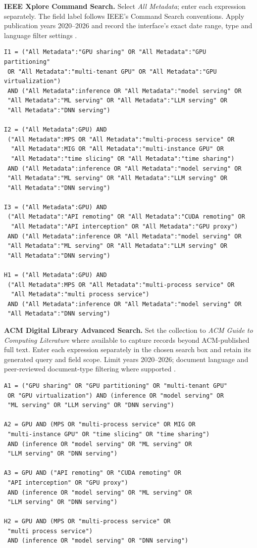 \noindent\textbf{IEEE Xplore Command Search.} Select \emph{All Metadata}; enter each expression separately. The field label follows IEEE's Command Search conventions. Apply publication years 2020--2026 and record the interface's exact date range, type and language filter settings \cite{ieeeSearch}.
\begin{Verbatim}[fontsize=\footnotesize,breaklines=true]
I1 = ("All Metadata":"GPU sharing" OR "All Metadata":"GPU partitioning"
 OR "All Metadata":"multi-tenant GPU" OR "All Metadata":"GPU virtualization")
 AND ("All Metadata":inference OR "All Metadata":"model serving" OR
 "All Metadata":"ML serving" OR "All Metadata":"LLM serving" OR
 "All Metadata":"DNN serving")

I2 = ("All Metadata":GPU) AND
 ("All Metadata":MPS OR "All Metadata":"multi-process service" OR
  "All Metadata":MIG OR "All Metadata":"multi-instance GPU" OR
  "All Metadata":"time slicing" OR "All Metadata":"time sharing")
 AND ("All Metadata":inference OR "All Metadata":"model serving" OR
 "All Metadata":"ML serving" OR "All Metadata":"LLM serving" OR
 "All Metadata":"DNN serving")

I3 = ("All Metadata":GPU) AND
 ("All Metadata":"API remoting" OR "All Metadata":"CUDA remoting" OR
  "All Metadata":"API interception" OR "All Metadata":"GPU proxy")
 AND ("All Metadata":inference OR "All Metadata":"model serving" OR
 "All Metadata":"ML serving" OR "All Metadata":"LLM serving" OR
 "All Metadata":"DNN serving")

H1 = ("All Metadata":GPU) AND
 ("All Metadata":MPS OR "All Metadata":"multi-process service" OR
  "All Metadata":"multi process service")
 AND ("All Metadata":inference OR "All Metadata":"model serving" OR
 "All Metadata":"DNN serving")
\end{Verbatim}

\noindent\textbf{ACM Digital Library Advanced Search.} Set the collection to \emph{ACM Guide to Computing Literature} where available to capture records beyond ACM-published full text. Enter each expression separately in the chosen search box and retain its generated query and field scope. Limit years 2020--2026; document language and peer-reviewed document-type filtering where supported \cite{acmSearch}.
\begin{Verbatim}[fontsize=\footnotesize,breaklines=true]
A1 = ("GPU sharing" OR "GPU partitioning" OR "multi-tenant GPU"
 OR "GPU virtualization") AND (inference OR "model serving" OR
 "ML serving" OR "LLM serving" OR "DNN serving")

A2 = GPU AND (MPS OR "multi-process service" OR MIG OR
 "multi-instance GPU" OR "time slicing" OR "time sharing")
 AND (inference OR "model serving" OR "ML serving" OR
 "LLM serving" OR "DNN serving")

A3 = GPU AND ("API remoting" OR "CUDA remoting" OR
 "API interception" OR "GPU proxy")
 AND (inference OR "model serving" OR "ML serving" OR
 "LLM serving" OR "DNN serving")

H2 = GPU AND (MPS OR "multi-process service" OR
 "multi process service")
 AND (inference OR "model serving" OR "DNN serving")
\end{Verbatim}


